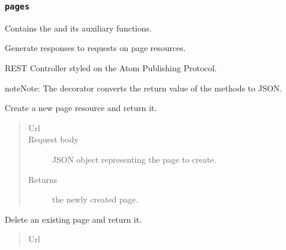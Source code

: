 \documentclass[letterpaper,10pt,english]{sphinxmanual}
\begin{document}
\subsubsection{\texttt{pages}}
\label{api:module-onlinelinguisticdatabase.controllers.pages}\label{api:pages}
Contains the {\hyperref[api:onlinelinguisticdatabase.controllers.pages.PagesController]{}} and its auxiliary functions.
\label{api:module-pages}

\begin{fulllineitems}
\label{api:onlinelinguisticdatabase.controllers.pages.PagesController}
Generate responses to requests on page resources.

REST Controller styled on the Atom Publishing Protocol.

\begin{notice}{note}{Note:}
The  decorator converts the return value of the methods to
JSON.
\end{notice}

\begin{fulllineitems}
\label{api:onlinelinguisticdatabase.controllers.pages.PagesController.create}
Create a new page resource and return it.
\begin{quote}\begin{description}
\item[{Url }] \leavevmode
{}

\item[{Request body}] \leavevmode
JSON object representing the page to create.

\item[{Returns}] \leavevmode
the newly created page.

\end{description}\end{quote}

\end{fulllineitems}


\begin{fulllineitems}
\label{api:onlinelinguisticdatabase.controllers.pages.PagesController.delete}
Delete an existing page and return it.
\begin{quote}\begin{description}
\item[{Url }] \leavevmode
{}


\end{description}
\end{quote}
\end{fulllineitems}
\end{fulllineitems}
\end{document}
